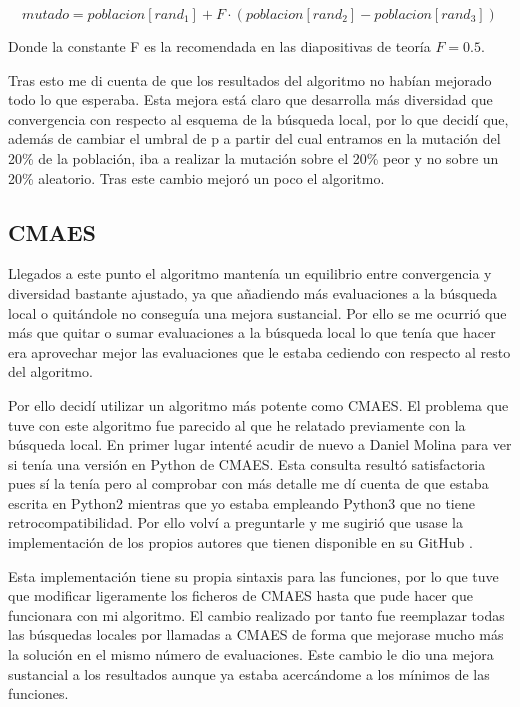 \documentclass[12pt,a4paper]{article}
\begin{document}
    $$mutado = poblacion[rand_1] + F\cdot (poblacion[rand_2]-poblacion[rand_3])$$
    
    Donde la constante F es la recomendada en las diapositivas de teoría $F=0.5.$
    
    Tras esto me di cuenta de que los resultados del algoritmo no habían mejorado todo lo que esperaba. Esta mejora está claro que desarrolla más diversidad que convergencia con respecto al esquema de la búsqueda local, por lo que decidí que, además de cambiar el umbral de p a partir del cual entramos en la mutación del 20\% de la población, iba a realizar la mutación sobre el 20\% peor y no sobre un 20\% aleatorio. Tras este cambio mejoró un poco el algoritmo.
    
    \subsection{CMAES}
    
    Llegados a este punto el algoritmo mantenía un equilibrio entre convergencia y diversidad bastante ajustado, ya que añadiendo más evaluaciones a la búsqueda local o quitándole no conseguía una mejora sustancial. Por ello se me ocurrió que más que quitar o sumar evaluaciones a la búsqueda local lo que tenía que hacer era aprovechar mejor las evaluaciones que le estaba cediendo con respecto al resto del algoritmo.
    
    Por ello decidí utilizar un algoritmo más potente como CMAES. El problema que tuve con este algoritmo fue parecido al que he relatado previamente con la búsqueda local. En primer lugar intenté acudir de nuevo a Daniel Molina para ver si tenía una versión en Python de CMAES. Esta consulta resultó satisfactoria pues sí la tenía pero al comprobar con más detalle me dí cuenta de que estaba escrita en Python2 mientras que yo estaba empleando Python3 que no tiene retrocompatibilidad. Por ello volví a preguntarle y me sugirió que usase la implementación de los propios autores que tienen disponible en su GitHub \cite{PYCMA}.
    
    Esta implementación tiene su propia sintaxis para las funciones, por lo que tuve que modificar ligeramente los ficheros de CMAES hasta que pude hacer que funcionara con mi algoritmo. El cambio realizado por tanto fue reemplazar todas las búsquedas locales por llamadas a CMAES de forma que mejorase mucho más la solución en el mismo número de evaluaciones. Este cambio le dio una mejora sustancial a los resultados aunque ya estaba acercándome a los mínimos de las funciones.
    
\end{document}

